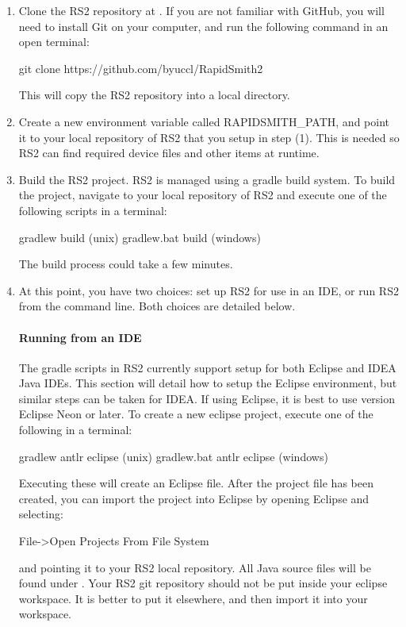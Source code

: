 \begin{enumerate}
  \item Clone the RS2 repository at
  {}. If you are not
  familiar with GitHub, you will need to install Git on your computer, and run the
  following command in an open terminal: 
\vspace{-0.07in}
\begin{code}
git clone https://github.com/byuccl/RapidSmith2
\end{code} 
  \noindent This will copy the RS2 repository into a local directory.
  \item Create a new environment variable called RAPIDSMITH\_PATH, and point it
  to your local repository of RS2 that you setup in step (1). This is needed so
  RS2 can find required device files and other items at runtime.
  \item Build the  RS2 project. RS2 is managed using a gradle build system.
  To build the project, navigate to your local repository of RS2 and execute one
  of the following scripts in a terminal:
  \begin{code}
	gradlew build (unix)
	gradlew.bat build (windows)
  \end{code}
  The build process could take a few minutes.
  \item At this point, you have two choices: set up RS2 for use in an IDE, or
  run RS2 from the command line. Both choices are detailed below.
  \paragraph{Running from an IDE} The gradle scripts in RS2 currently support
  setup for both Eclipse and IDEA Java IDEs. This section will detail how to
  setup the Eclipse environment, but similar steps can be taken for IDEA. If
  using Eclipse, it is best to use version Eclipse Neon or later. To create a
  new eclipse project, execute one of the following in a terminal:
  \begin{code}
	gradlew antlr eclipse (unix)       
	gradlew.bat antlr eclipse (windows)
  \end{code}
  Executing these will create an Eclipse  file. After the project
  file has been created, you can import the project into Eclipse by opening
  Eclipse and selecting:
  \begin{code}
	File->Open Projects From File System 
  \end{code}
  and pointing it to your RS2 local repository. All Java source files
  will be found under .  Your RS2 git repository
  should not be put inside your eclipse workspace. It is better to put it
  elsewhere, and then import it into your workspace.

\end{enumerate}
